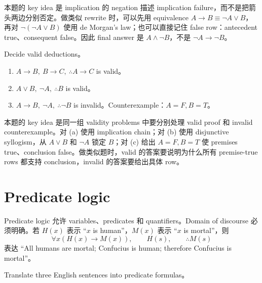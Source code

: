 \begin{explanation}
本题的 key idea 是 implication 的 negation 描述 implication failure，而不是把箭头两边分别否定。做类似 rewrite 时，可以先用 equivalence \(A\to B\equiv\lnot A\lor B\)，再对 \(\lnot(\lnot A\lor B)\) 使用 de Morgan's law；也可以直接记住 false row：antecedent true、consequent false。因此 final answer 是 \(A\land\lnot B\)，不是 \(\lnot A\to\lnot B\)。
\end{explanation}

\begin{exerciseblock}
Decide valid deductions。
\end{exerciseblock}

\begin{solution}
\begin{enumerate}[label=(\alph*)]
  \item \(A\to B,\ B\to C,\ \therefore A\to C\) is valid。
  \item \(A\lor B,\ \lnot A,\ \therefore B\) is valid。
  \item \(A\to B,\ \lnot A,\ \therefore \lnot B\) is invalid。Counterexample：\(A=F,B=T\)。
\end{enumerate}
\end{solution}

\begin{explanation}
本题的 key idea 是同一组 validity problems 中要分别处理 valid proof 和 invalid counterexample。对 (a) 使用 implication chain；对 (b) 使用 disjunctive syllogism，从 \(A\lor B\) 和 \(\lnot A\) 锁定 \(B\)；对 (c) 给出 \(A=F,B=T\) 使 premises true、conclusion false。做类似题时，valid 的答案要说明为什么所有 premise-true rows 都支持 conclusion，invalid 的答案要给出具体 row。
\end{explanation}

\section{Predicate logic}

Predicate logic 允许 variables、predicates 和 quantifiers。Domain of discourse 必须明确。若 \(H(x)\) 表示 ``\(x\) is human''，\(M(x)\) 表示 ``\(x\) is mortal''，则
\[
\forall x(H(x)\to M(x)),\qquad H(s),\qquad \therefore M(s)
\]
表达 ``All humans are mortal; Confucius is human; therefore Confucius is mortal''。

\begin{exerciseblock}
Translate three English sentences into predicate formulas。
\end{exerciseblock}

